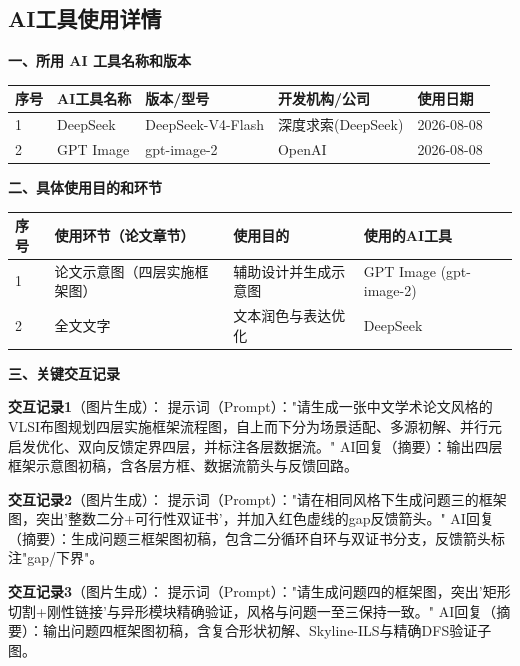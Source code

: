 \documentclass{JXUSTmodeling}
\begin{document}
\begin{appendixx}
  \section{AI工具使用详情}
  \textbf{一、所用 AI 工具名称和版本}

  \begin{tabular}{lllll}
  	\toprule[1.5pt]
  	序号&AI工具名称&版本/型号&开发机构/公司&使用日期\\
  	\midrule
  	1&DeepSeek&DeepSeek-V4-Flash&深度求索(DeepSeek)&2026-08-08\\
  	2&GPT Image&gpt-image-2&OpenAI&2026-08-08\\
  	\bottomrule[1.5pt]
  \end{tabular}

  \textbf{二、具体使用目的和环节}

  \begin{tabular}{llll}
  	\toprule[1.5pt]
  	序号&使用环节（论文章节）&使用目的&使用的AI工具\\
  	\midrule
  	1&论文示意图（四层实施框架图）&辅助设计并生成示意图&GPT Image (gpt-image-2)\\
  	2&全文文字&文本润色与表达优化&DeepSeek\\
  	\bottomrule[1.5pt]
  \end{tabular}

  \textbf{三、关键交互记录}

  \textbf{交互记录1}（图片生成）：\newline
  提示词（Prompt）："请生成一张中文学术论文风格的VLSI布图规划四层实施框架流程图，自上而下分为场景适配、多源初解、并行元启发优化、双向反馈定界四层，并标注各层数据流。"\newline
  AI回复（摘要）：输出四层框架示意图初稿，含各层方框、数据流箭头与反馈回路。

  \textbf{交互记录2}（图片生成）：\newline
  提示词（Prompt）："请在相同风格下生成问题三的框架图，突出'整数二分+可行性双证书'，并加入红色虚线的gap反馈箭头。"\newline
  AI回复（摘要）：生成问题三框架图初稿，包含二分循环自环与双证书分支，反馈箭头标注"gap/下界"。

  \textbf{交互记录3}（图片生成）：\newline
  提示词（Prompt）："请生成问题四的框架图，突出'矩形切割+刚性链接'与异形模块精确验证，风格与问题一至三保持一致。"\newline
  AI回复（摘要）：输出问题四框架图初稿，含复合形状初解、Skyline-ILS与精确DFS验证子图。


\end{appendixx}
\end{document}
